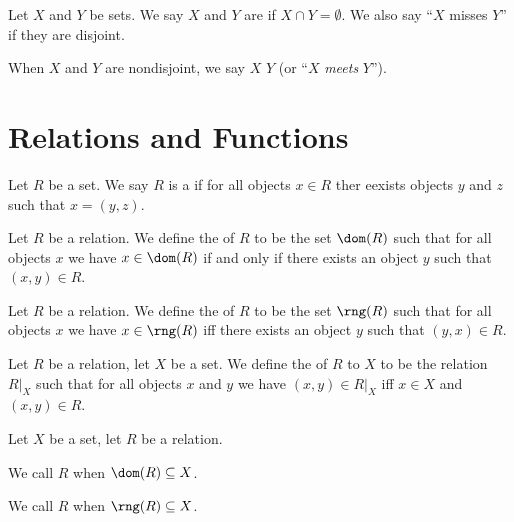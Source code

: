 \begin{definition}
Let $X$ and $Y$ be sets. We say $X$ and $Y$ are  if
$X\cap Y=\emptyset$. We also say ``$X$ misses $Y$'' if they are disjoint.

When $X$ and $Y$ are nondisjoint, we say $X$  $Y$
(or ``$X$ \emph{meets} $Y$'').
\end{definition}

\section{Relations and Functions}

\begin{definition}[Relation]
Let $R$ be a set. We say $R$ is a  if for all objects
$x\in R$ ther eexists objects $y$ and $z$ such that $x = (y,z)$.
\end{definition}

\begin{definition}
Let $R$ be a relation. We define the  of $R$ to be the
set $\dom(R)$ such that for all objects $x$ we have $x\in\dom(R)$ if
and only if there exists an object $y$ such that $(x,y)\in R$.
\end{definition}

\begin{definition}
Let $R$ be a relation. We define the  of $R$ to be the
set $\rng(R)$ such that for all objects $x$ we have $x\in\rng(R)$ iff
there exists an object $y$ such that $(y,x)\in R$.
\end{definition}

\begin{definition}
Let $R$ be a relation, let $X$ be a set.
We define the  of $R$ to $X$ to be the relation
$R|_{X}$ such that for all objects $x$ and $y$ we have $(x,y)\in R|_{X}$
iff $x\in X$ and $(x,y)\in R$.
\end{definition}

\begin{definition}
Let $X$ be a set, let $R$ be a relation.

We call $R$  when $\dom(R)\subset X$.

We call $R$  when $\rng(R)\subset X$.
\end{definition}

